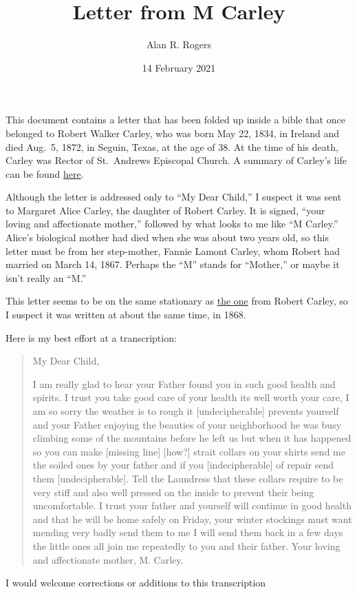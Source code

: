 \documentclass[12pt]{article}
\begin{document}
\title{Letter from M Carley}
\author{Alan R. Rogers}
\date{14 February 2021}
\maketitle

This document contains a letter that has been folded up inside a bible
that once belonged to Robert Walker Carley, who was born May 22, 1834,
in Ireland and died Aug.\ 5, 1872, in Seguin, Texas, at the age of
38. At the time of his death, Carley was Rector of St.\ Andrews
Episcopal Church. A summary of Carley's life can be found
\href{https://www.newspapers.com/clip/21483199/robert-walker-carley-bio-from-seguin}{here}.

Although the letter is addressed only to ``My Dear Child,'' I suspect
it was sent to Margaret Alice Carley, the daughter of Robert
Carley. It is signed, ``your loving and affectionate mother,''
followed by what looks to me like ``M Carley.'' Alice's biological
mother had died when she was about two years old, so this letter must
be from her step-mother, Fannie Lamont Carley, whom Robert had married
on March 14, 1867. Perhaps the ``M'' stands for ``Mother,'' or maybe
it isn't really an ``M.''

This letter seems to be on the same stationary as
\href{./RobtCarley.pdf}{the one} from Robert Carley, so I suspect it
was written at about the same time, in 1868.

Here is my best effort at a transcription:
\begin{quotation}
  \noindent My Dear Child,

  I am really glad to hear your Father found you in such good health
  and spirits. I trust you take good care of your health its well
  worth your care, I am so sorry the weather is to rough it
  [undecipherable] prevents yourself and your Father enjoying the
  beauties of your neighborhood he was busy climbing some of the
  mountains before he left us but when it has happened so you can make
  [missing line] [how?] strait collars on your shirts send me the
  soiled ones by your father and if you [indecipherable] of repair
  send them [undecipherable]. Tell the Laundress that these collars
  require to be very stiff and also well pressed on the inside to
  prevent their being uncomfortable. I trust your father and yourself
  will continue in good health and that he will be home safely on
  Friday, your winter stockings must want mending very badly send them
  to me I will send them back in a few days the little ones all join
  me repeatedly to you and their father. Your loving and affectionate
  mother, M. Carley.
\end{quotation}
I would welcome corrections or additions to this transcription
\end{document}
